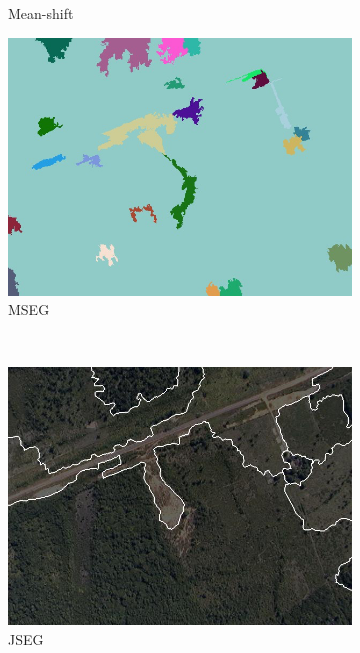 \begin{figure}[htb]
\begin{minipage}[r]{0.48\linewidth}
\begin{subfigure}{.47\linewidth}
			\caption{Mean-shift}
		\end{subfigure}
		\begin{subfigure}{.47\linewidth}
			\includegraphics[width=\linewidth]{imgs/seg_mseg}
			\caption{MSEG}
		\end{subfigure}%
		\\
		\begin{subfigure}{.47\linewidth}
			\includegraphics[width=\linewidth]{imgs/seg_jseg}
			\caption{JSEG}
		\end{subfigure}
		\begin{subfigure}{.47\linewidth}

\end{subfigure}
\end{minipage}
\end{figure}
